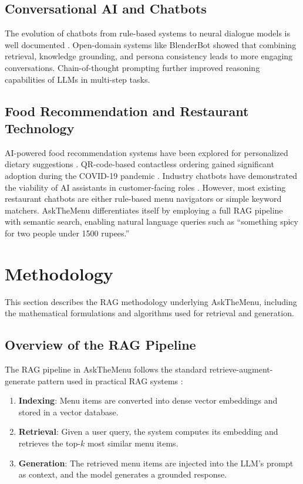\subsection{Conversational AI and Chatbots}
The evolution of chatbots from rule-based systems to neural dialogue models is well documented \cite{Adamopoulou2020Chatbot, Ni2023ChatbotSurvey}. Open-domain systems like BlenderBot \cite{Roller2021BlenderBot} showed that combining retrieval, knowledge grounding, and persona consistency leads to more engaging conversations. Chain-of-thought prompting \cite{Wei2022ChainOfThought} further improved reasoning capabilities of LLMs in multi-step tasks.

\subsection{Food Recommendation and Restaurant Technology}
AI-powered food recommendation systems have been explored for personalized dietary suggestions \cite{Pecune2021FoodChatbot, Palasundram2021FoodRec}. QR-code-based contactless ordering gained significant adoption during the COVID-19 pandemic \cite{Sharma2021QR}. Industry chatbots have demonstrated the viability of AI assistants in customer-facing roles \cite{Okuda2024FoodAI}. However, most existing restaurant chatbots are either rule-based menu navigators or simple keyword matchers. AskTheMenu differentiates itself by employing a full RAG pipeline with semantic search, enabling natural language queries such as ``something spicy for two people under 1500 rupees.''


\section{Methodology}\label{sec:methodology}

This section describes the RAG methodology underlying AskTheMenu, including the mathematical formulations and algorithms used for retrieval and generation.

\subsection{Overview of the RAG Pipeline}

The RAG pipeline in AskTheMenu follows the standard retrieve-augment-generate pattern used in practical RAG systems \cite{AWS2024RAG}:

\begin{enumerate}
    \item \textbf{Indexing}: Menu items are converted into dense vector embeddings and stored in a vector database.
    \item \textbf{Retrieval}: Given a user query, the system computes its embedding and retrieves the top-$k$ most similar menu items.
    \item \textbf{Generation}: The retrieved menu items are injected into the LLM's prompt as context, and the model generates a grounded response.
\end{enumerate}

